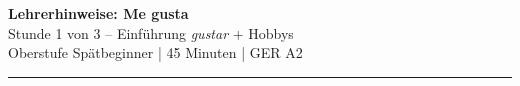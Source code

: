 \documentclass[10pt, a4paper]{article}
\newcommand{\es}[1]{\textcolor{spanisch}{\textit{#1}}}
\begin{document}

\begin{center}
    {\Large\bfseries\color{spanisch} Lehrerhinweise: Me gusta}\\[4pt]
    {\normalsize Stunde 1 von 3 -- Einführung \es{gustar} + Hobbys}\\[2pt]
    {\small\color{grau} Oberstufe Spätbeginner | 45 Minuten | GER A2}
\end{center}

\vspace{-4pt}
\hrule
\vspace{8pt}

\end{document}
